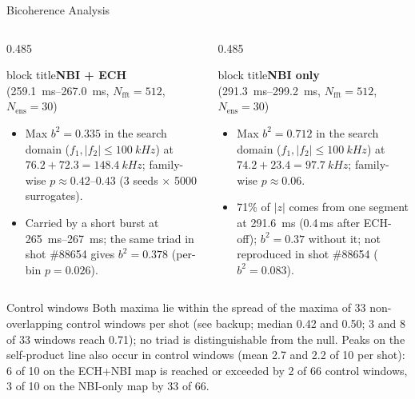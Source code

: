 \documentclass[aspectratio=169,xcolor=table]{beamer}
\newcommand{\colhead}[1]{%
    \begin{beamercolorbox}[wd=\linewidth,sep=0.6ex,center]{block title}#1\end{beamercolorbox}}
\begin{document}
\begin{frame}{Bicoherence Analysis}
    \begin{columns}[onlytextwidth,T]
        \begin{column}{0.485\textwidth}
            \colhead{\textbf{NBI + ECH}\\[-0.2ex]{\scriptsize(\SIrange{259.1}{267.0}{ms}, $N_{\text{fft}}=512$, $N_{\text{ens}}=30$)}}
            \vspace{0.04cm}
            \footnotesize
            \begin{itemize}
                \item Max $b^2=0.335$ in the search domain ($f_1,|f_2|\le\SI{100}{kHz}$) at $76.2+72.3=\SI{148.4}{kHz}$; family-wise $p\approx0.42$--$0.43$ (3 seeds $\times$ 5000 surrogates).
                \item Carried by a short burst at \SIrange{265}{267}{ms}; the same triad in shot \#88654 gives $b^2=0.378$ (per-bin $p=0.026$).
            \end{itemize}
        \end{column}%
        \hfill
        \begin{column}{0.485\textwidth}
            \colhead{\textbf{NBI only}\\[-0.2ex]{\scriptsize(\SIrange{291.3}{299.2}{ms}, $N_{\text{fft}}=512$, $N_{\text{ens}}=30$)}}
            \vspace{0.04cm}
            \footnotesize
            \begin{itemize}
                \item Max $b^2=0.712$ in the search domain ($f_1,|f_2|\le\SI{100}{kHz}$) at $74.2+23.4=\SI{97.7}{kHz}$; family-wise $p\approx0.06$.
                \item 71\% of $|z|$ comes from one segment at \SI{291.6}{ms} (0.4\,ms after ECH-off); $b^2=0.37$ without it; not reproduced in shot \#88654 ($b^2=0.083$).
            \end{itemize}
        \end{column}
    \end{columns}
    \vspace{0.06cm}
    \begin{alertblock}{Control windows}
        \footnotesize Both maxima lie within the spread of the maxima of 33 non-overlapping control windows per shot (see backup; median 0.42 and 0.50; 3 and 8 of 33 windows reach 0.71); no triad is distinguishable from the null. Peaks on the self-product line also occur in control windows (mean 2.7 and 2.2 of 10 per shot): 6 of 10 on the ECH+NBI map is reached or exceeded by 2 of 66 control windows, 3 of 10 on the NBI-only map by 33 of 66.
    \end{alertblock}
\end{frame}
\end{document}
